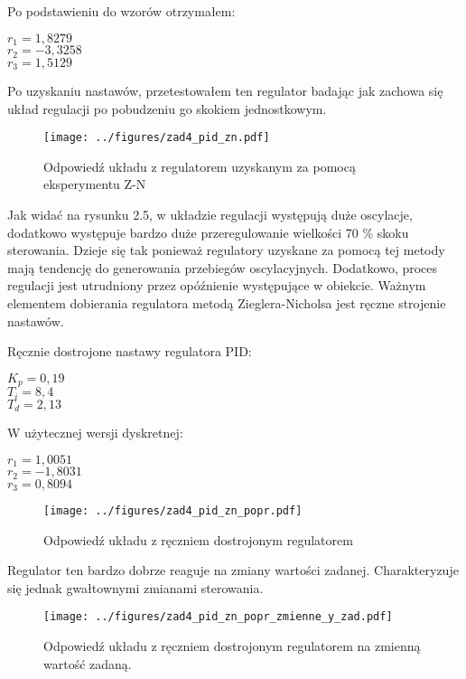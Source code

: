 \documentclass[a4paper,titlepage,11pt,floatssmall]{mwrep}
\begin{document}
Po podstawieniu do wzorów otrzymałem:
\begin{center}
	$r_1 = 1,8279$ \\
	
	$r_2 = -3,3258$ \\

	$r_3 = 1,5129$ \\
\end{center}

Po uzyskaniu nastawów, przetestowałem ten regulator badając jak zachowa się układ regulacji po pobudzeniu go skokiem jednostkowym.

\begin{figure}[H]
\centering
\texttt{[image: ../figures/zad4\_pid\_zn.pdf]}
\caption{Odpowiedź układu z regulatorem uzyskanym za pomocą eksperymentu Z-N}
\end{figure}

\bigskip

Jak widać na rysunku 2.5, w układzie regulacji występują duże oscylacje, dodatkowo występuje bardzo duże przeregulowanie wielkości 70 \% skoku sterowania. Dzieje się tak ponieważ regulatory uzyskane za pomocą tej metody mają tendencję do generowania przebiegów oscylacyjnych. Dodatkowo, proces regulacji jest utrudniony przez opóźnienie występujące w obiekcie. Ważnym elementem dobierania regulatora metodą Zieglera-Nicholsa jest ręczne strojenie nastawów.

Ręcznie dostrojone nastawy regulatora PID:

\begin{center}
	$K_p = 0,19$ \\
	$T_i = 8,4$ \\
	$T_d = 2,13$ \\
\end{center}

W użytecznej wersji dyskretnej:

\begin{center}
	$r_1 = 1,0051$ \\  
	$r_2 = -1,8031$ \\ 
	$r_3 = 0,8094$ \\
\end{center}

\begin{figure}[H]
\centering
\texttt{[image: ../figures/zad4\_pid\_zn\_popr.pdf]}
\caption{Odpowiedź układu z ręczniem dostrojonym regulatorem}
\end{figure}
\newpage 
Regulator ten bardzo dobrze reaguje na zmiany wartości zadanej. Charakteryzuje się jednak gwałtownymi zmianami sterowania.
\begin{figure}[H]
\centering
\texttt{[image: ../figures/zad4\_pid\_zn\_popr\_zmienne\_y\_zad.pdf]}
\caption{Odpowiedź układu z ręczniem dostrojonym regulatorem na zmienną wartość zadaną.}
\end{figure}
\end{document}
